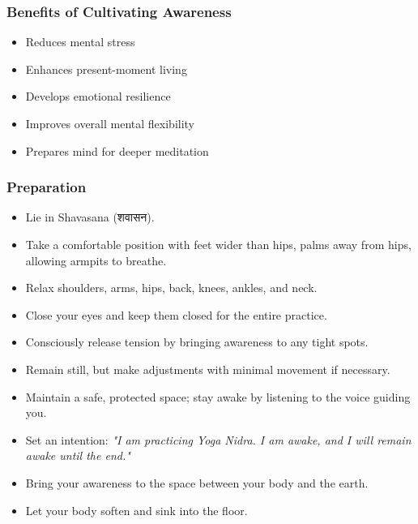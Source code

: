 \begin{frame}[fragile]\frametitle{Benefits of Cultivating Awareness}
    \begin{itemize}
        \item Reduces mental stress
        \item Enhances present-moment living
        \item Develops emotional resilience
        \item Improves overall mental flexibility
        \item Prepares mind for deeper meditation
    \end{itemize}
\end{frame}


\begin{frame}[fragile]\frametitle{Preparation}
    \begin{itemize}
        \item Lie in Shavasana (शवासन).
        \item Take a comfortable position with feet wider than hips, palms away from hips, allowing armpits to breathe.
        \item Relax shoulders, arms, hips, back, knees, ankles, and neck.
        \item Close your eyes and keep them closed for the entire practice.
        \item Consciously release tension by bringing awareness to any tight spots.
        \item Remain still, but make adjustments with minimal movement if necessary.
        \item Maintain a safe, protected space; stay awake by listening to the voice guiding you.
        \item Set an intention: \textit{"I am practicing Yoga Nidra. I am awake, and I will remain awake until the end."}
        \item Bring your awareness to the space between your body and the earth.
        \item Let your body soften and sink into the floor.    
	\end{itemize}
	
\end{frame}

